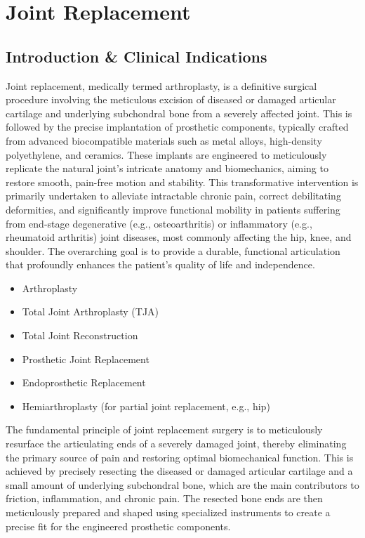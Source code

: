 \chapter{Joint Replacement}

\section*{Introduction \& Clinical Indications}
Joint replacement, medically termed arthroplasty, is a definitive surgical procedure involving the meticulous excision of diseased or damaged articular cartilage and underlying subchondral bone from a severely affected joint. This is followed by the precise implantation of prosthetic components, typically crafted from advanced biocompatible materials such as metal alloys, high-density polyethylene, and ceramics. These implants are engineered to meticulously replicate the natural joint's intricate anatomy and biomechanics, aiming to restore smooth, pain-free motion and stability. This transformative intervention is primarily undertaken to alleviate intractable chronic pain, correct debilitating deformities, and significantly improve functional mobility in patients suffering from end-stage degenerative (e.g., osteoarthritis) or inflammatory (e.g., rheumatoid arthritis) joint diseases, most commonly affecting the hip, knee, and shoulder. The overarching goal is to provide a durable, functional articulation that profoundly enhances the patient's quality of life and independence.

\begin{itemize}
  \item Arthroplasty
  \item Total Joint Arthroplasty (TJA)
  \item Total Joint Reconstruction
  \item Prosthetic Joint Replacement
  \item Endoprosthetic Replacement
  \item Hemiarthroplasty (for partial joint replacement, e.g., hip)
\end{itemize}

The fundamental principle of joint replacement surgery is to meticulously resurface the articulating ends of a severely damaged joint, thereby eliminating the primary source of pain and restoring optimal biomechanical function. This is achieved by precisely resecting the diseased or damaged articular cartilage and a small amount of underlying subchondral bone, which are the main contributors to friction, inflammation, and chronic pain. The resected bone ends are then meticulously prepared and shaped using specialized instruments to create a precise fit for the engineered prosthetic components.

